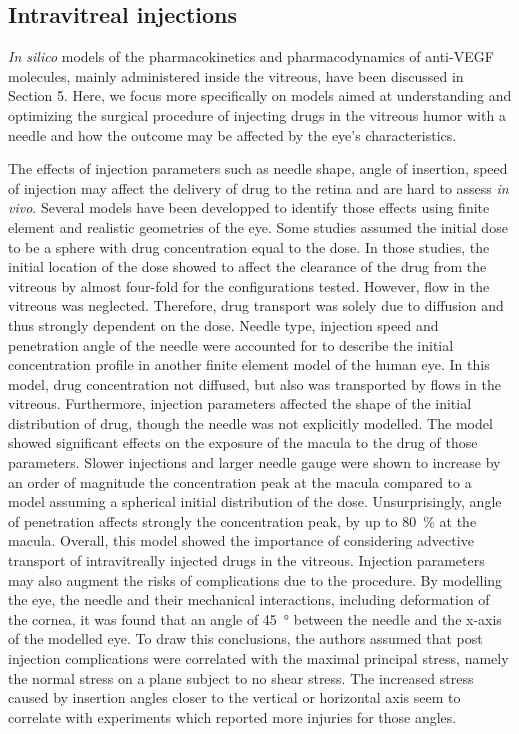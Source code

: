 \documentclass[12pt,a4paper]{journal}
\begin{document}
\subsection*{Intravitreal injections}

\textit{In silico} models of the pharmacokinetics and pharmacodynamics of anti-VEGF molecules, mainly administered inside the vitreous, have been discussed in Section 5.
Here, we focus more specifically on models aimed at understanding and optimizing the surgical procedure of injecting drugs in the vitreous humor with a needle and how the outcome may be affected by the eye's characteristics.

The effects of injection parameters such as needle shape, angle of insertion, speed of injection may affect the delivery of drug to the retina and are hard to assess \textit{in vivo}.
Several models have been developped to identify those effects using finite element and realistic geometries of the eye.
Some studies assumed the initial dose to be a sphere with drug concentration equal to the dose.\cite{Friedrich_1997,Friedrich_1997a}
In those studies, the initial location of the dose showed to affect the clearance of the drug from the vitreous by almost four-fold for the configurations tested.\cite{Friedrich_1997}
However, flow in the vitreous was neglected.
Therefore, drug transport was solely due to diffusion and thus strongly dependent on the dose.\cite{Friedrich_1997}
Needle type, injection speed and penetration angle of the needle were accounted for to describe the initial concentration profile in another finite element model of the human eye.\cite{Jooybar_2014}
In this model, drug concentration not diffused, but also was transported by flows in the vitreous.
Furthermore, injection parameters affected the shape of the initial distribution of drug, though the needle was not explicitly modelled.
The model showed significant effects on the exposure of the macula to the drug of those parameters.
Slower injections and larger needle gauge were shown to increase by an order of magnitude the concentration peak at the macula compared to a model assuming a spherical initial distribution of the dose.
Unsurprisingly, angle of penetration affects strongly the concentration peak, by up to \SI{80}{\percent} at the macula.\cite{Jooybar_2014}
Overall, this model showed the importance of considering advective transport of intravitreally injected drugs in the vitreous. 
Injection parameters may also augment the risks of complications due to the procedure.
By modelling the eye, the needle and their mechanical interactions, including deformation of the cornea, it was found that an angle of \SI{45}{\degree} between the needle and the x-axis of the modelled eye.\cite{Karimi_2018}
To draw this conclusions, the authors assumed that post injection complications were correlated with the maximal principal stress, namely the normal stress on a plane subject to no shear stress.  
The increased stress caused by insertion angles closer to the vertical or horizontal axis seem to correlate with experiments which reported more injuries for those angles.\cite{Karimi_2018}
\end{document}
